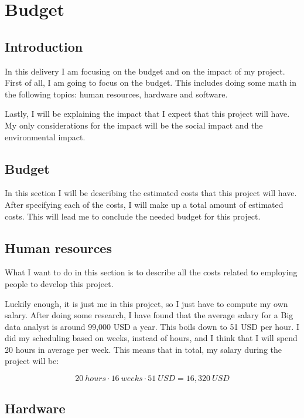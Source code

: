 
\section{Budget}

\subsection{Introduction}

In this delivery I am focusing on the budget and on the impact of my project.
First of all, I am going to focus on the budget. This includes doing some math
in the following topics: human resources, hardware and software.

Lastly, I will be explaining the impact that I expect that this project will
have. My only considerations for the impact will be the social impact and the
environmental impact.

\subsection{Budget}

In this section I will be describing the estimated costs that this project will
have. After specifying each of the costs, I will make up a total amount of
estimated costs. This will lead me to conclude the needed budget for this
project.

\subsection{Human resources}

What I want to do in this section is to describe all the costs related to
employing people to develop this project.

Luckily enough, it is just me in this project, so I just have to compute my own
salary. After doing some research, I have found that the average salary for a
Big data analyst is around 99,000 USD a year. This boils down to 51 USD per
hour. I did my scheduling based on weeks, instead of hours, and I think that I
will spend 20 hours in average per week. This means that in total, my salary
during the project will be:

\[
  20\ hours \cdot 16\ weeks \cdot 51\ USD = 16,320\ USD
\]


\subsection{Hardware}

